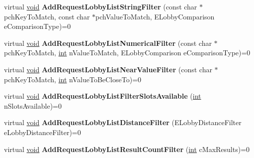 \begin{DoxyCompactItemize}
\item 
\hypertarget{classISteamMatchmaking_aa001d585efefb54852f5569726232947}{}virtual \hyperlink{SDL__audio_8h_a52835ae37c4bb905b903cbaf5d04b05f}{void} {\bfseries Add\+Request\+Lobby\+List\+String\+Filter} (const char $\ast$pch\+Key\+To\+Match, const char $\ast$pch\+Value\+To\+Match, E\+Lobby\+Comparison e\+Comparison\+Type)=0\label{classISteamMatchmaking_aa001d585efefb54852f5569726232947}

\item 
\hypertarget{classISteamMatchmaking_a9b3409ec2ef08baaeb025009def84acd}{}virtual \hyperlink{SDL__audio_8h_a52835ae37c4bb905b903cbaf5d04b05f}{void} {\bfseries Add\+Request\+Lobby\+List\+Numerical\+Filter} (const char $\ast$pch\+Key\+To\+Match, \hyperlink{SDL__thread_8h_a6a64f9be4433e4de6e2f2f548cf3c08e}{int} n\+Value\+To\+Match, E\+Lobby\+Comparison e\+Comparison\+Type)=0\label{classISteamMatchmaking_a9b3409ec2ef08baaeb025009def84acd}

\item 
\hypertarget{classISteamMatchmaking_a6977bdd1ce695749985c61668c3e4758}{}virtual \hyperlink{SDL__audio_8h_a52835ae37c4bb905b903cbaf5d04b05f}{void} {\bfseries Add\+Request\+Lobby\+List\+Near\+Value\+Filter} (const char $\ast$pch\+Key\+To\+Match, \hyperlink{SDL__thread_8h_a6a64f9be4433e4de6e2f2f548cf3c08e}{int} n\+Value\+To\+Be\+Close\+To)=0\label{classISteamMatchmaking_a6977bdd1ce695749985c61668c3e4758}

\item 
\hypertarget{classISteamMatchmaking_a9575334e8b8368a4d4ac15174bc251ca}{}virtual \hyperlink{SDL__audio_8h_a52835ae37c4bb905b903cbaf5d04b05f}{void} {\bfseries Add\+Request\+Lobby\+List\+Filter\+Slots\+Available} (\hyperlink{SDL__thread_8h_a6a64f9be4433e4de6e2f2f548cf3c08e}{int} n\+Slots\+Available)=0\label{classISteamMatchmaking_a9575334e8b8368a4d4ac15174bc251ca}

\item 
\hypertarget{classISteamMatchmaking_a3531dd34afff30653f000770a8b5ba67}{}virtual \hyperlink{SDL__audio_8h_a52835ae37c4bb905b903cbaf5d04b05f}{void} {\bfseries Add\+Request\+Lobby\+List\+Distance\+Filter} (E\+Lobby\+Distance\+Filter e\+Lobby\+Distance\+Filter)=0\label{classISteamMatchmaking_a3531dd34afff30653f000770a8b5ba67}

\item 
\hypertarget{classISteamMatchmaking_a7af4082331b6a35ceee7450c7b00f21f}{}virtual \hyperlink{SDL__audio_8h_a52835ae37c4bb905b903cbaf5d04b05f}{void} {\bfseries Add\+Request\+Lobby\+List\+Result\+Count\+Filter} (\hyperlink{SDL__thread_8h_a6a64f9be4433e4de6e2f2f548cf3c08e}{int} c\+Max\+Results)=0\label{classISteamMatchmaking_a7af4082331b6a35ceee7450c7b00f21f}


\end{DoxyCompactItemize}

